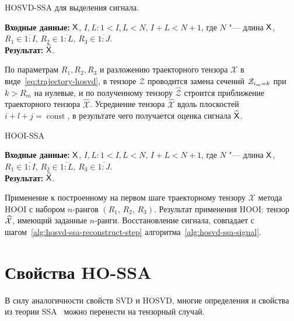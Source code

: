 \documentclass[specialist,
    substylefile=spbu.rtx,
    subf,href,colorlinks=true, 12pt]{disser}
\theoremstyle{plain}
\theoremstyle{definition}
\theoremstyle{remark}
\newcommand{\Input}{\textbf{Входные данные: }}
\newcommand{\Output}{\textbf{Результат: }}
\begin{document}
    \begin{algorithm}[!ht]
        \caption{HOSVD-SSA для выделения сигнала.}
        \label{alg:hosvd-ssa-signal}
        \Input $\mathsf{X}$, $I,L: 1< I,L < N,\, I + L < N + 1$, где $N$ "--- длина $\mathsf{X}$, $R_1 \in \overline{1:I}$,
        $R_2 \in \overline{1:L}$, $R_3 \in \overline{1:J}$.\\
        \Output $\widehat{\mathsf{X}}$.

        \begin{algorithmic}[1]
            \State По параметрам $R_1, R_2, R_3$ и разложению траекторного тензора $\mathcal{X}$
            в виде~\eqref{eq:trajectory-hosvd},
            в тензоре $\mathcal{Z}$ проводится замена сечений $\mathcal{Z}_{i_m = k}$ при $k>R_m$ на нулевые,
            и по полученному тензору $\widehat{\mathcal{Z}}$
            строится приближение траекторного тензора $\widehat{\mathcal{X}}$.
            \State \label{alg:hosvd-ssa-reconstruct-step}
            Усреднение тензора $\widehat{\mathcal{X}}$ вдоль плоскостей $i+l+j=\operatorname{const}$,
            в результате чего получается оценка сигнала $\widehat{\mathsf{X}}$.
        \end{algorithmic}
    \end{algorithm}

    \begin{algorithm}[!ht]
        \caption{HOOI-SSA}
        \label{alg:hooi-ssa}
        \Input $\mathsf{X}$, $I,L: 1< I,L <N,\, I + L < N + 1$, где $N$ "--- длина $\mathsf{X}$, $R_1 \in \overline{1:I}$,
        $R_2 \in \overline{1:L}$, $R_3 \in \overline{1:J}$.\\
        \Output $\widehat{\mathsf{X}}$.

        \begin{algorithmic}[1]
            \State Применение к построенному на первом шаге траекторному тензору $\mathcal{X}$ метода
            HOOI с набором $n$-рангов $(R_1,\, R_2,\, R_3)$. Результат применения HOOI: тензор $\widehat{\mathcal{X}}$,
            имеющий заданные $n$-ранги.
            \State Восстановление сигнала, совпадает с шагом~\ref{alg:hosvd-ssa-reconstruct-step}
            алгоритма~\ref{alg:hosvd-ssa-signal}.
        \end{algorithmic}
    \end{algorithm}


    \section{Свойства HO-SSA}\label{sec:HO-SSA-properties}
    В силу аналогичности свойств SVD и HOSVD, многие определения и свойства из теории SSA~\cite{ssa} можно перенести на тензорный случай.
\end{document}
